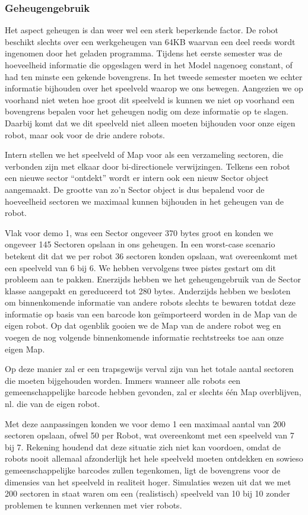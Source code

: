 \documentclass[12pt,a4paper]{report}
\begin{document}
\subsubsection{Geheugengebruik}

Het aspect geheugen is dan weer wel een sterk beperkende factor. De robot beschikt slechts over een werkgeheugen van 64KB waarvan een deel reeds wordt ingenomen door het geladen programma. Tijdens het eerste semester was de hoeveelheid informatie die opgeslagen werd in het Model nagenoeg constant, of had ten minste een gekende bovengrens. In het tweede semester moeten we echter informatie bijhouden over het speelveld waarop we ons bewegen. Aangezien we op voorhand niet weten hoe groot dit speelveld is kunnen we niet op voorhand een bovengrens bepalen voor het geheugen nodig om deze informatie op te slagen. Daarbij komt dat we dit speelveld niet alleen moeten bijhouden voor onze eigen robot, maar ook voor de drie andere robots.

Intern stellen we het speelveld of Map voor als een verzameling sectoren, die verbonden zijn met elkaar door bi-directionele verwijzingen. Telkens een robot een nieuwe sector ``ontdekt'' wordt er intern ook een nieuw Sector object aangemaakt. De grootte van zo'n Sector object is dus bepalend voor de hoeveelheid sectoren we maximaal kunnen bijhouden in het geheugen van de robot.

Vlak voor demo 1, was een Sector ongeveer 370 bytes groot en konden we ongeveer 145 Sectoren opslaan in ons geheugen. In een worst-case scenario betekent dit dat we per robot 36 sectoren konden opslaan, wat overeenkomt met een speelveld van 6 bij 6. We hebben vervolgens twee pistes gestart om dit probleem aan te pakken. Enerzijds hebben we het geheugengebruik van de Sector klasse aangepakt en gereduceerd tot 280 bytes. Anderzijds hebben we besloten om binnenkomende informatie van andere robots slechts te bewaren totdat deze informatie op basis van een barcode kon ge\"importeerd worden in de Map van de eigen robot. Op dat ogenblik gooien we de Map van de andere robot weg en voegen de nog volgende binnenkomende informatie rechtstreeks toe aan onze eigen Map.

Op deze manier zal er een trapsgewijs verval zijn van het totale aantal sectoren die moeten bijgehouden worden. Immers wanneer alle robots een gemeenschappelijke barcode hebben gevonden, zal er slechts \'e\'en Map overblijven, nl. die van de eigen robot.

Met deze aanpassingen konden we voor demo 1 een maximaal aantal van 200 sectoren opslaan, ofwel 50 per Robot, wat overeenkomt met een speelveld van 7 bij 7. Rekening houdend dat deze situatie zich niet kan voordoen, omdat de robots nooit allemaal afzonderlijk het hele speelveld moeten ontdekken en sowieso gemeenschappelijke barcodes zullen tegenkomen, ligt de bovengrens voor de dimensies van het speelveld in realiteit hoger. Simulaties wezen uit dat we met 200 sectoren in staat waren om een (realistisch) speelveld van 10 bij 10 zonder problemen te kunnen verkennen met vier robots.
\end{document}
